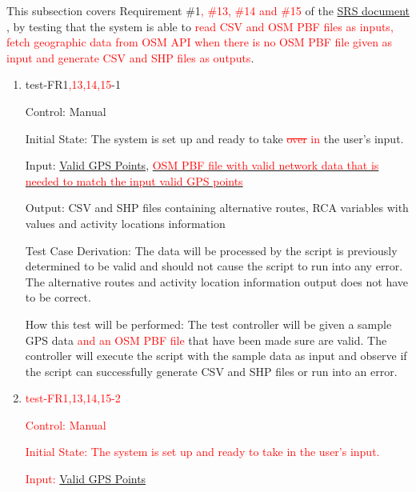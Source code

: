 \documentclass[12pt, titlepage]{article}
\begin{document}
This subsection covers Requirement \#1\textcolor{red}{, \#13, \#14 and \#15} of the \href{https://github.com/paezha/PyERT-BLACK/blob/main/docs/SRS/SRS.pdf}{SRS document} \citep{SRS}, by testing that the system is able to \textcolor{red}{read CSV and OSM PBF files as inputs, fetch geographic data from OSM API when there is no OSM PBF file given as input and generate CSV and SHP files as outputs}.

\begin{enumerate}

\item{test-FR1\textcolor{red}{,13,14,15}-1\\} \label{test-FR1,13,14,15-1}

Control: Manual 
					
Initial State: The system is set up and ready to take \textcolor{red}{\sout{over} in} the user's input.
					
Input: \href{https://github.com/paezha/PyERT-BLACK/blob/rev0-test/quarto-example/data/sample-gps/sample-gps-1.csv}{Valid GPS Points}, \href{https://github.com/paezha/PyERT-BLACK/blob/rev0-test/quarto-example/data/sample-osm/planet_-80.265,43.283_-79.276,43.734.osm.pbf}{\textcolor{red}{OSM PBF file with valid network data that is needed to match the input valid GPS points}}
					
Output: CSV and SHP files containing alternative routes, RCA variables with values and activity locations information

Test Case Derivation: The data will be processed by the script is previously determined to be valid and should not cause the script to run into any error. The alternative routes and activity location information output does not have to be correct.
					
How this test will be performed: The test controller will be given a sample GPS data \textcolor{red}{and an OSM PBF file} that have been made sure are valid. The controller will execute the script with the sample data as input and observe if the script can successfully generate CSV and SHP files or run into an error.  


\item{\textcolor{red}{test-FR1,13,14,15-2}\\} \label{test-FR1,13,14,15-2}

\textcolor{red}{Control: Manual}
					
\textcolor{red}{Initial State: The system is set up and ready to take in the user's input.}
					
\textcolor{red}{Input: \href{https://github.com/paezha/PyERT-BLACK/blob/rev0-test/quarto-example/data/sample-gps/sample-gps-1.csv}{Valid GPS Points}}
					

\end{enumerate}
\end{document}
